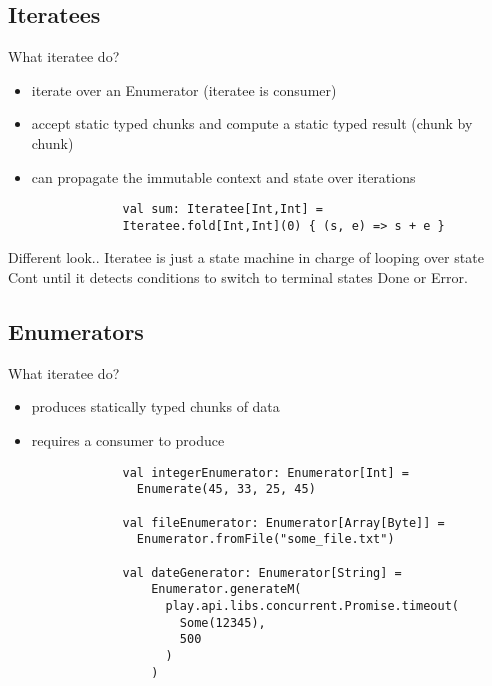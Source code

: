 \documentclass{beamer}
\begin{document}
	\subsection{Iteratees}
		\begin{frame}[fragile]
			What iteratee do?
			\begin{itemize}
				\pause \item iterate over an Enumerator (iteratee is consumer)
				\pause \item accept static typed chunks and compute a static typed result (chunk by chunk)
				\pause \item can propagate the immutable context and state over iterations
			\end{itemize}

			\pause \begin{lstlisting}
				val sum: Iteratee[Int,Int] =
			    Iteratee.fold[Int,Int](0) { (s, e) => s + e }
			\end{lstlisting}

			\pause \begin{block}{Different look..}
				Iteratee is just a state machine in charge of looping over state Cont until it detects conditions to switch to terminal states Done or Error.
			\end{block}
		\end{frame}

	\subsection{Enumerators}
		\begin{frame}[fragile]
			What iteratee do?
			\begin{itemize}
				\pause \item produces statically typed chunks of data
				\pause \item requires a consumer to produce
			\end{itemize}

			\pause \begin{lstlisting}
				val integerEnumerator: Enumerator[Int] =
				  Enumerate(45, 33, 25, 45)

				val fileEnumerator: Enumerator[Array[Byte]] =
				  Enumerator.fromFile("some_file.txt")

				val dateGenerator: Enumerator[String] =
					Enumerator.generateM(
					  play.api.libs.concurrent.Promise.timeout(
					    Some(12345),
					    500
					  )
					)
			\end{lstlisting}
		\end{frame}
\end{document}
